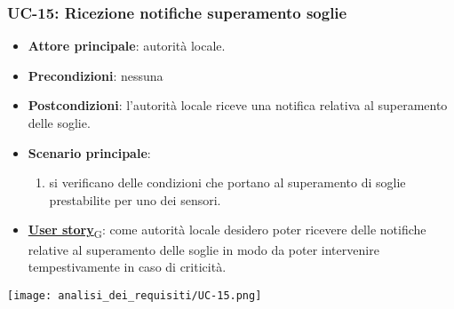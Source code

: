 \subsubsection{UC-15: Ricezione notifiche superamento soglie}
\begin{itemize}
	\item \textbf{Attore principale}: autorità locale.
	\item \textbf{Precondizioni}: nessuna
	\item \textbf{Postcondizioni}: l'autorità locale riceve una notifica relativa al superamento delle soglie.
	\item \textbf{Scenario principale}:
	      \begin{enumerate}
		      \item si verificano delle condizioni che portano al superamento di soglie prestabilite per uno dei sensori.
	      \end{enumerate}
	\item \href{https://7last.github.io/docs/rtb/documentazione-interna/glossario\#user-story}{\textbf{User story}\textsubscript{G}}:
	      come autorità locale desidero poter ricevere delle notifiche relative al superamento delle soglie in modo da poter intervenire tempestivamente in caso di criticità.
\end{itemize}
\begin{center}
	\texttt{[image: analisi\_dei\_requisiti/UC-15.png]}
\end{center}

\newpage

